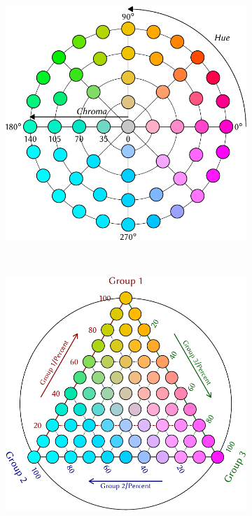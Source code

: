 \documentclass[a4paper]{scrartcl}
\begin{document}
\begin{appendix}
\begin{figure}[htb!]
  \begin{subfigure}[t]{0.3\textwidth}
  \centering
  \includegraphics[width = \textwidth]{../fig/plot-cielch.pdf}
  \label{fig:cielch}
  \end{subfigure}%
  ~
  \begin{subfigure}[t]{0.3\textwidth}
  \includegraphics[width = \textwidth]{../fig/plot-ternary.pdf}

\end{subfigure}
\end{figure}
\end{appendix}
\end{document}
